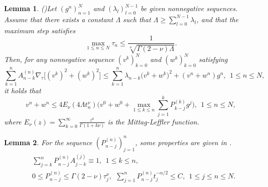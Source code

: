 \documentclass[11pt]{article}
\newtheorem{lemma}{Lemma}[section]
\numberwithin{equation}{section}
\begin{document}
\begin{lemma}\label{grownwall}
(\cite{LyuP2022SFOR})Let $(g^n)_{n=1}^N$ and $(\lambda_l)_{l=0}^{N-1}$ be given nonnegative sequences. Assume that there exists a constant $\Lambda$ such that $\Lambda\geq\sum_{l=0}^{N-1}\lambda_l$, and that the maximum step satisfies 
$$\max_{1\leq n \leq N}\tau_n\leq \frac{1}{\sqrt[\nu]{\Gamma{(2-\nu)}\Lambda}}.$$
Then, for any nonnegative sequence $(v^k)_{k=0}^N$ and $(w^k)_{k=0}^N$ satisfying
$$\sum_{k=1}^nA_{n-k}^{(n)}\nabla_\tau\big[(v^k)^2+(w^k)^2\big]\leq\sum_{k=1}^n\lambda_{n-k}\big(v^k+w^k\big)^2+(v^n+w^n)g^n,~~1\leq n\leq N,$$
it holds that
$$v^n+w^n\leq 4E_\nu(4\Lambda t_n^\nu)\bigg(v^0+w^0+\max_{1\leq k\leq n}\sum_{j=1}^kP_{k-j}^{(k)}g^j\bigg),~~1\leq n\leq N,$$
where $E_\nu(z)=\sum_{k=0}^\infty\frac{z^k}{\Gamma{(1+k\nu)}}$ is the Mittag-Leffler function.
\end{lemma}

\begin{lemma}\label{P}
For the sequence $(P_{n-j}^{(n)})_{j=1}^n$, some properties are given in \cite{LiaoH2018L1}.
\begin{align*}
&\sum_{j=k}^nP_{n-j}^{(n)}A_{j-k}^{(j)}\equiv1,~~1\leq k\leq n,\\
&0\leq P_{n-j}^{(n)}\leq \Gamma{(2-\nu)}\tau_j^\nu,~~\sum_{j=1}^nP_{n-j}^{(n)}t_j^{-\alpha/2}\leq C,~~ 1\leq j\leq n\leq N.  
\end{align*}
\end{lemma}
\end{document}
